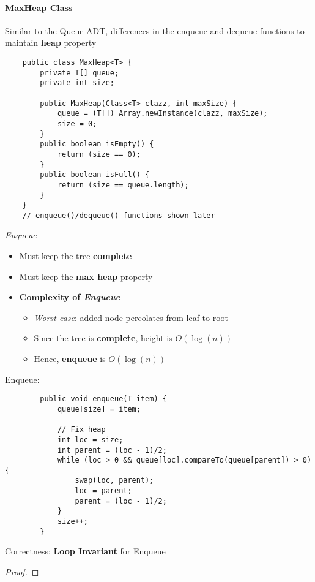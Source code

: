 \documentclass[10pt, 
a4paper, 
oneside, 
headinclude, footinclude, 
BCOR5mm]
{scrartcl}
\begin{document}
\paragraph{\textbf{MaxHeap Class}}
Similar to the Queue ADT, differences in the enqueue and dequeue functions to maintain \textbf{heap} property
\begin{lstlisting}
    public class MaxHeap<T> {
        private T[] queue;
        private int size;

        public MaxHeap(Class<T> clazz, int maxSize) {
            queue = (T[]) Array.newInstance(clazz, maxSize);
            size = 0;
        }
        public boolean isEmpty() {
            return (size == 0);
        }
        public boolean isFull() {
            return (size == queue.length);
        }
    }
    // enqueue()/dequeue() functions shown later
\end{lstlisting}

\begin{definition}
    \textit{Enqueue}
    \begin{itemize}
        \item Must keep the tree \textbf{complete}
        \item Must keep the \textbf{max heap} property
        \item \textbf{Complexity of \textit{Enqueue}}
        \begin{itemize}
            \item \textit{Worst-case}: added node percolates from leaf to root
            \item Since the tree is \textbf{complete}, height is $O(\log(n))$
            \item Hence, \textbf{enqueue} is $O(\log(n))$
        \end{itemize}
    \end{itemize}
    \newpage
    Enqueue:
    \begin{lstlisting}
        public void enqueue(T item) {
            queue[size] = item;

            // Fix heap
            int loc = size;
            int parent = (loc - 1)/2;
            while (loc > 0 && queue[loc].compareTo(queue[parent]) > 0) {
                swap(loc, parent);
                loc = parent;
                parent = (loc - 1)/2;
            }
            size++;
        }
    \end{lstlisting}
    Correctness: \textbf{Loop Invariant} for Enqueue
    \begin{proof}
        
    \end{proof}
\end{definition}
\end{document}
